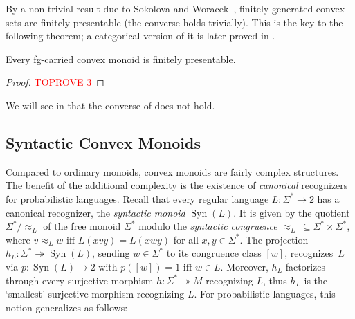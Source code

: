 \documentclass[a4paper, UKenglish, numberwithinsect, thm-restate, cleveref, final]{lipics-v2021}
\theoremstyle{plain}
\theoremstyle{definition}
\newcommand{\finite}{fg-carried\xspace}
\DeclareMathOperator{\Syn}{Syn}
\newcommand{\epito}{\ensuremath{\twoheadrightarrow}}
\numberwithin{equation}{section}
\begin{document}
 By a non-trivial result due to Sokolova and Woracek~\cite{sokolova-15}, finitely generated
 convex sets are finitely presentable (the converse holds trivially). This is the key to the
 following theorem; a categorical version of it is later proved in .

\begin{theorem}\label{thm:fg-carried-implies-fp}
Every \finite convex monoid is finitely presentable.
\end{theorem}
\begin{proof}\textcolor{red}{TOPROVE 3}\end{proof}


\noindent
We will see in  that the converse of  does not hold.


\subsection{Syntactic Convex Monoids}\label{sec:syn-conv-mon}
Compared to ordinary monoids, convex monoids are fairly complex structures. The benefit of the additional complexity is the existence of \emph{canonical} recognizers for probabilistic languages. Recall that every regular language $L\colon \Sigma^*\to 2$ has a canonical recognizer, the \emph{syntactic monoid} $\Syn(L)$. It is given by the quotient \(\Sigma^{*} \! / \!\! \approx_{L}\) of the free monoid $\Sigma^*$ modulo the \emph{syntactic congruence} $\approx_L\, \subseteq \Sigma^*\times \Sigma^*$, where $v \approx_{L} w$ iff $L(xvy) = L(xwy)$ for all $x,y\in \Sigma^*$. The projection $h_L\colon \Sigma^*\epito \Syn(L)$, sending $w\in  \Sigma^*$ to its congruence class $[w]$, recognizes~$L$ via \(p \colon \Syn(L) \rightarrow 2\) with \(p([w])= 1 \text{ iff } w \in L\). Moreover, $h_L$ factorizes through every surjective morphism $h\colon \Sigma^*\epito M$ recognizing $L$, thus $h_L$ is the `smallest' surjective morphism recognizing $L$.
For probabilistic languages, this notion generalizes as follows:
\end{document}
